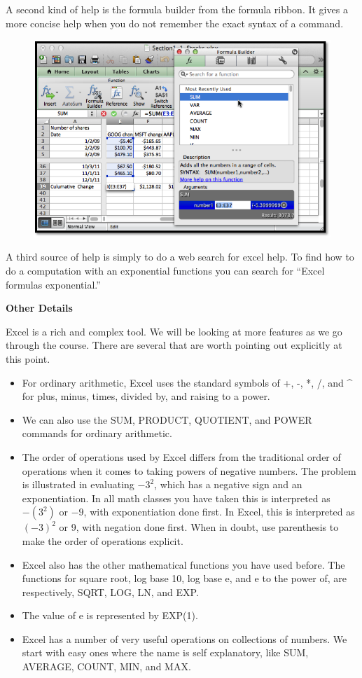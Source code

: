 \documentclass[10pt,]{book}
\newcommand{\terminology}[1]{\textbf{#1}}
\theoremstyle{plain}
\theoremstyle{definition}
\theoremstyle{definition}
\begin{document}
A second kind of help is the formula builder from the formula ribbon.  It gives a more concise help when you do not remember the exact syntax of a command.%
\leavevmode%
\begin{figure}
\centering
\includegraphics[width=0.8\linewidth]{images/sec1-3-18.png}
\end{figure}
\par
A third source of help is simply to do a web search for excel help.  To find how to do a computation with an exponential functions you can search for “Excel formulas exponential.”%
\par
\terminology{
Other Details}%
\par
Excel is a rich and complex tool.  We will be looking at more features as we go through the course.  There are several that are worth pointing out explicitly at this point.%
\leavevmode%
\begin{itemize}[label=\textbullet]
\item{}For ordinary arithmetic, Excel uses the standard symbols of +, -, *, /, and \textasciicircum{} for plus, minus, times, divided by, and raising to a power.
%
\item{}We can also use the SUM, PRODUCT, QUOTIENT, and POWER commands for ordinary arithmetic.
%
\item{}The order of operations used by Excel differs from the traditional order of operations when it comes to taking powers of negative numbers.  The problem is illustrated in evaluating  \(-3^2\), which has a negative sign and an exponentiation. In all math classes you have taken this is interpreted as \(-(3^2)\) or \(-9\), with exponentiation done first.  In Excel, this is interpreted as \((-3)^2\) or 9, with negation done first.  When in doubt, use parenthesis to make the order of operations explicit.
%
\item{}Excel also has the other mathematical functions you have used before.  The functions for square root, log base 10, log base e, and e to the power of, are respectively, SQRT, LOG, LN, and EXP.
%
\item{}The value of e is represented by EXP(1). 
%
\item{}Excel has a number of very useful operations on collections of numbers.  We start with easy ones where the name is self explanatory, like SUM, AVERAGE, COUNT, MIN, and MAX.
%
\end{itemize}
\typeout{************************************************}
\typeout{************************************************}
\end{document}
